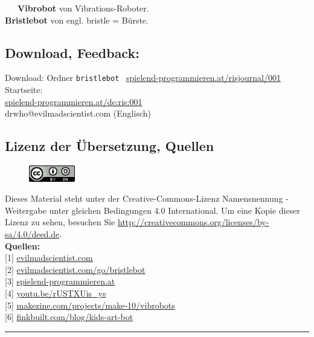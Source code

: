 \documentclass[10pt,a4paper,ngerman,twoside]{article} %
\newcommand{\SepRule}{\noindent	%
\begin{center}
\rule{250pt}{1pt} %
\end{center}
}
\begin{document}
\begin{multicols}{3}
~~~\textbf{Vibrobot} von Vibrations-Roboter. \\

\textbf{Bristlebot} von engl. bristle = Bürste. \\

\newpage
\subsection*{Download, Feedback:}
\footnotesize{
Download: Ordner \texttt{bristlebot} \Mundus\ \href{http://spielend-programmieren.at/risjournal/001}{spielend-programmieren.at/risjournal/001}\\
Startseite:\\
\href{http://spielend-programmieren.at/de:ris:001}{spielend-programmieren.at/de:ris:001}\\ 
\Letter\:  drwho@evilmadscientist.com (Englisch) \\}
\normalsize
 

\subsection*{Lizenz der Übersetzung, Quellen}
\begin{figure}
\includegraphics[width=2cm]{ccbysa88x31.png}
\end{figure}
Dieses Material steht unter der Creative-Commons-Lizenz Namensnennung - Weitergabe unter gleichen Bedingungen 4.0 International. Um eine Kopie dieser Lizenz zu sehen, besuchen Sie \url{http://creativecommons.org/licenses/by-sa/4.0/deed.de}. \\

\textbf{Quellen:}\\
{[}1{]} \href{http://www.evilmadscientist.com/about/}{evilmadscientist.com} \\
{[}2{]} \href{http://www.evilmadscientist.com/go/bristlebot}{evilmadscientist.com/go/bristlebot} \\
{[}3{]} \href{http://spielend-programmieren.at}{spielend-programmieren.at} \\
{[}4{]} \href{http://youtu.be/rUSTXUis_ys}{youtu.be/rUSTXUis\_ys} \\
{[}5{]} \href{http://makezine.com/projects/make-10/vibrobots/}{makezine.com/projects/make-10/vibrobots} \\
{[}6{]} \href{http://www.finkbuilt.com/blog/kids-art-bot/}{finkbuilt.com/blog/kids-art-bot} 

\end{multicols}
\SepRule
\end{document}
